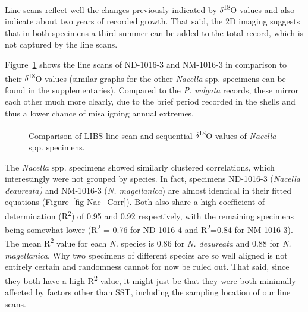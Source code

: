 \documentclass[
  authoryear,
  preprint,
  3p]{elsarticle}
\begin{document}
Line scans reflect well the changes previously indicated by
\(\delta\)\textsuperscript{18}O values and also indicate about two years
of recorded growth. That said, the 2D imaging suggests that in both
specimens a third summer can be added to the total record, which is not
captured by the line scans.

Figure~\ref{fig-Nac_Comp} shows the line scans of ND-1016-3 and
NM-1016-3 in comparison to their \(\delta\)\textsuperscript{18}O values
(similar graphs for the other \emph{Nacella} spp. specimens can be found
in the supplementaries). Compared to the \emph{P. vulgata} records,
these mirror each other much more clearly, due to the brief period
recorded in the shells and thus a lower chance of misaligning annual
extremes.

\begin{figure}


\caption{\label{fig-Nac_Comp}Comparison of LIBS line-scan and sequential
\(\delta\)\textsuperscript{18}O-values of \emph{Nacella} spp.
specimens.}

\end{figure}%

The \emph{Nacella} spp. specimens showed similarly clustered
correlations, which interestingly were not grouped by species. In fact,
specimens ND-1016-3 (\emph{Nacella deaureata)} and NM-1016-3 (\emph{N.
magellanica}) are almost identical in their fitted equations
(Figure~\ref{fig-Nac_Corr}). Both also share a high coefficient of
determination (R\textsuperscript{2}) of 0.95 and 0.92 respectively, with
the remaining specimens being somewhat lower (R\textsuperscript{2} =
0.76 for ND-1016-4 and R\textsuperscript{2}=0.84 for NM-1016-3). The
mean R\textsuperscript{2} value for each \emph{N.} species is 0.86 for
\emph{N. deaureata} and 0.88 for \emph{N. magellanica}. Why two
specimens of different species are so well aligned is not entirely
certain and randomness cannot for now be ruled out. That said, since
they both have a high R\textsuperscript{2} value, it might just be that
they were both minimally affected by factors other than SST, including
the sampling location of our line scans.
\end{document}

